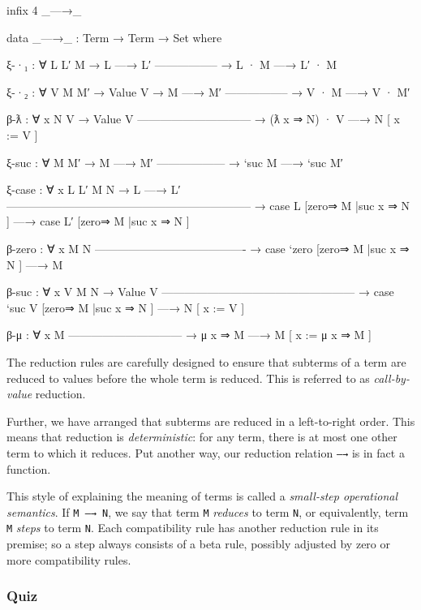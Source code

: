 \begin{fence}
\begin{code}
infix 4 _—→_

data _—→_ : Term → Term → Set where

  ξ-·₁ : ∀ {L L′ M}
    → L —→ L′
      -----------------
    → L · M —→ L′ · M

  ξ-·₂ : ∀ {V M M′}
    → Value V
    → M —→ M′
      -----------------
    → V · M —→ V · M′

  β-ƛ : ∀ {x N V}
    → Value V
      ------------------------------
    → (ƛ x ⇒ N) · V —→ N [ x := V ]

  ξ-suc : ∀ {M M′}
    → M —→ M′
      ------------------
    → `suc M —→ `suc M′

  ξ-case : ∀ {x L L′ M N}
    → L —→ L′
      -----------------------------------------------------------------
    → case L [zero⇒ M |suc x ⇒ N ] —→ case L′ [zero⇒ M |suc x ⇒ N ]

  β-zero : ∀ {x M N}
      ----------------------------------------
    → case `zero [zero⇒ M |suc x ⇒ N ] —→ M

  β-suc : ∀ {x V M N}
    → Value V
      ---------------------------------------------------
    → case `suc V [zero⇒ M |suc x ⇒ N ] —→ N [ x := V ]

  β-μ : ∀ {x M}
      ------------------------------
    → μ x ⇒ M —→ M [ x := μ x ⇒ M ]
\end{code}
\end{fence}

The reduction rules are carefully designed to ensure that subterms of a
term are reduced to values before the whole term is reduced. This is
referred to as \emph{call-by-value} reduction.

Further, we have arranged that subterms are reduced in a left-to-right
order. This means that reduction is \emph{deterministic}: for any term,
there is at most one other term to which it reduces. Put another way,
our reduction relation \texttt{—→} is in fact a function.

This style of explaining the meaning of terms is called a
\emph{small-step operational semantics}. If \texttt{M\ —→\ N}, we say
that term \texttt{M} \emph{reduces} to term \texttt{N}, or equivalently,
term \texttt{M} \emph{steps} to term \texttt{N}. Each compatibility rule
has another reduction rule in its premise; so a step always consists of
a beta rule, possibly adjusted by zero or more compatibility rules.

\hypertarget{quiz-1}{%
\subsubsection{Quiz}\label{quiz-1}}

